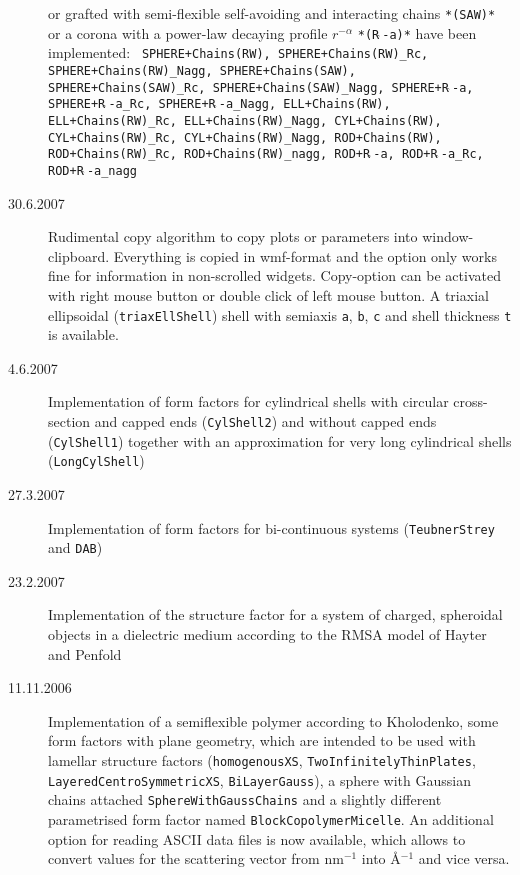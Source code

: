 \begin{description}
    or grafted with semi-flexible self-avoiding and interacting chains \texttt{*(SAW)*} or
    a corona with a power-law decaying profile $r^{-\alpha}$ \texttt{*(R$\hat{~}$-a)*}
    have been implemented:
    \texttt{
    SPHERE+Chains(RW), SPHERE+Chains(RW)\_Rc, SPHERE+Chains(RW)\_Nagg,
    SPHERE+Chains(SAW), SPHERE+Chains(SAW)\_Rc, SPHERE+Chains(SAW)\_Nagg,
    SPHERE+R$\hat{~}$-a, SPHERE+R$\hat{~}$-a\_Rc, SPHERE+R$\hat{~}$-a\_Nagg,
    ELL+Chains(RW), ELL+Chains(RW)\_Rc, ELL+Chains(RW)\_Nagg,
    CYL+Chains(RW), CYL+Chains(RW)\_Rc, CYL+Chains(RW)\_Nagg,
    ROD+Chains(RW), ROD+Chains(RW)\_Rc, ROD+Chains(RW)\_nagg,
    ROD+R$\hat{~}$-a, ROD+R$\hat{~}$-a\_Rc, ROD+R$\hat{~}$-a\_nagg
    }
    \item[30.6.2007] Rudimental copy algorithm to copy plots or parameters into window-clipboard. Everything
    is copied in wmf-format and the option only works fine for information in non-scrolled widgets.
    Copy-option can be activated with right mouse button or double click of left mouse button.
    A triaxial ellipsoidal (\texttt{triaxEllShell}) shell with semiaxis \texttt{a}, \texttt{b}, \texttt{c}
    and shell thickness \texttt{t} is available.
    \item[4.6.2007] Implementation of form factors for cylindrical shells with circular cross-section and capped ends
    (\texttt{CylShell2}) and without capped ends (\texttt{CylShell1}) together with an approximation for very long
    cylindrical shells (\texttt{LongCylShell})
    \item[27.3.2007] Implementation of form factors for bi-continuous systems (\texttt{TeubnerStrey} and \texttt{DAB})
    \item[23.2.2007] Implementation of the structure factor for a system of charged, spheroidal objects in a
    dielectric medium according to the RMSA model of Hayter and Penfold
    \item[11.11.2006]  Implementation of a semiflexible polymer according to Kholodenko,
    some form factors with plane geometry, which are intended to be used with lamellar structure factors
    (\texttt{homogenousXS}, \texttt{TwoInfinitelyThinPlates},
     \texttt{LayeredCentroSymmetricXS}, \texttt{BiLayerGauss}), a sphere with Gaussian chains attached
    \texttt{SphereWithGaussChains} and a slightly different parametrised form factor named
    \texttt{BlockCopolymerMicelle}.
    An additional option for reading ASCII data files is now available,
    which allows to convert values for the scattering vector from
    nm$^{-1}$ into \AA$^{-1}$ and vice versa. \sloppy

\end{description}

